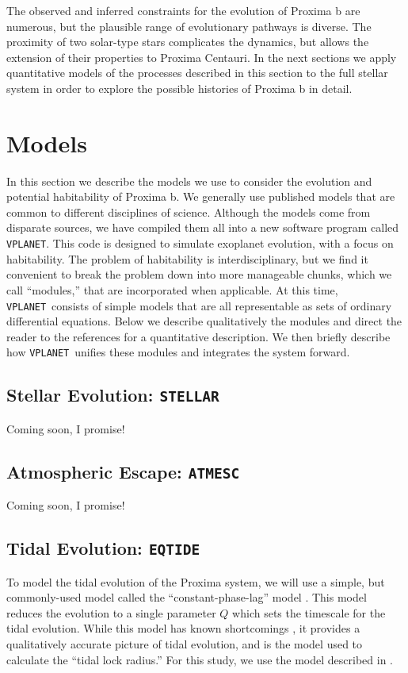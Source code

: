 \documentclass[preprint,12pt]{aastex}
\newcommand{\xxx}[1]{{\color{red} #1}} %
\def\vplanet{\texttt{\footnotesize{VPLANET}}\xspace}
\def\atmesc{\texttt{\footnotesize{ATMESC}}\xspace}
\def\eqtide{\texttt{\footnotesize{EQTIDE}}\xspace}
\def\stellar{\texttt{\footnotesize{STELLAR}}\xspace}
\begin{document}
The observed and inferred constraints for the evolution of Proxima b
are numerous, but the plausible range of evolutionary pathways is
diverse. The proximity of two solar-type stars complicates the
dynamics, but allows the extension of their properties to Proxima
Centauri. In the next sections we apply quantitative models of the
processes described in this section to the full stellar system in order to
explore the possible histories of Proxima b in detail.


\section{Models\label{sec:models}}

In this section we describe the models we use to consider the
evolution and potential habitability of Proxima b. We generally use
published models that are common to different disciplines of
science. Although the models come from disparate sources, we have
compiled them all into a new software program called \vplanet. This
code is designed to simulate exoplanet evolution, with a focus on
habitability. The problem of habitability is interdisciplinary, but we
find it convenient to break the problem down into more manageable
chunks, which we call ``modules,'' that are incorporated when
applicable. At this time, \vplanet~consists of simple models that are
all representable as sets of ordinary differential equations. Below we
describe qualitatively the modules and direct the reader to the
references for a quantitative description. We then briefly describe
how \vplanet~unifies these modules and integrates the system forward.

\subsection{Stellar Evolution: \stellar}
\label{sec:models:stellar}
\xxx{Coming soon, I promise!}

\subsection{Atmospheric Escape: \atmesc}
\label{sec:models:atmesc}
\xxx{Coming soon, I promise!}

\subsection{Tidal Evolution: \eqtide}
\label{sec:models:eqtide}
To model the tidal evolution of the Proxima system, we will use a
simple, but commonly-used model called the ``constant-phase-lag''
model \citep{Goldreich66,Greenberg09,Heller11}. This model reduces the
evolution to a single parameter $Q$ which sets the timescale for the
tidal evolution. While this model has known shortcomings
\citep{ToumaWisdom94,EfroimskyMakarov13}, it provides a qualitatively
accurate picture of tidal evolution, and is the model \cite{Kasting93}
used to calculate the ``tidal lock radius.'' For this study, we use
the model described in \cite{Heller11}.
\end{document}
